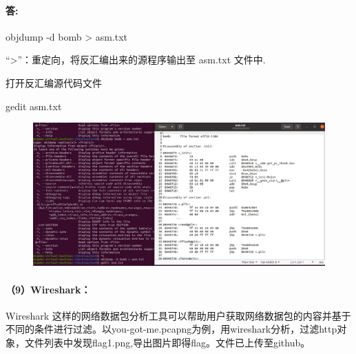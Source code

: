 \documentclass[a4paper, 12pt]{article}
\begin{document}
	\paragraph{答:}
	objdump -d bomb > asm.txt
	
	“>”：重定向，将反汇编出来的源程序输出至 asm.txt 文件中.
	
	打开反汇编源代码文件
	
	gedit asm.txt
	
	\begin{figure}[H]
		\centering
		\includegraphics[width=1\textwidth]{039.jpg}
	\end{figure}
	
	\paragraph{（9）Wireshark：}
	Wireshark 这样的网络数据包分析工具可以帮助用户获取网络数据包的内容并基于不同的条件进行过滤。以you-got-me.pcapng为例，用wireshark分析，过滤http对象，文件列表中发现flag1.png,导出图片即得flag。文件已上传至github。
	
\end{document}
